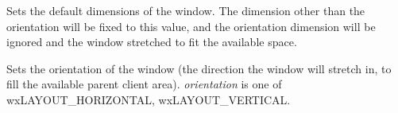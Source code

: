 
Sets the default dimensions of the window. The dimension other than the orientation will be fixed to this
value, and the orientation dimension will be ignored and the window stretched to fit the available space.

\label{wxsashlayoutwindowsetorientation}


Sets the orientation of the window (the direction the window will stretch in, to fill the available
parent client area). {\it orientation} is one of wxLAYOUT\_HORIZONTAL, wxLAYOUT\_VERTICAL.




